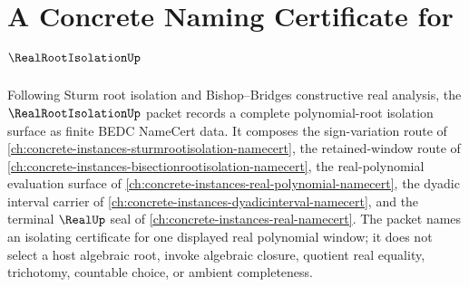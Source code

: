\chapter{A Concrete Naming Certificate for $\RealRootIsolationUp$}
\label{ch:concrete-instances-real-root-isolation-namecert}

Following Sturm root isolation and Bishop--Bridges constructive real analysis, the $\RealRootIsolationUp$ packet records a complete polynomial-root isolation surface as finite BEDC NameCert data. It composes the sign-variation route of \autoref{ch:concrete-instances-sturmrootisolation-namecert}, the retained-window route of \autoref{ch:concrete-instances-bisectionrootisolation-namecert}, the real-polynomial evaluation surface of \autoref{ch:concrete-instances-real-polynomial-namecert}, the dyadic interval carrier of \autoref{ch:concrete-instances-dyadicinterval-namecert}, and the terminal $\RealUp$ seal of \autoref{ch:concrete-instances-real-namecert}. The packet names an isolating certificate for one displayed real polynomial window; it does not select a host algebraic root, invoke algebraic closure, quotient real equality, trichotomy, countable choice, or ambient completeness.

